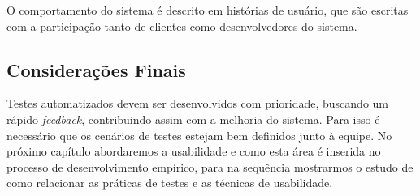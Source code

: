O comportamento do sistema é descrito em histórias de usuário, que são 
escritas com a participação tanto de clientes como desenvolvedores do sistema. 


\subsection{Considerações Finais}

Testes automatizados devem ser desenvolvidos com prioridade, buscando um rápido 
\textit{feedback}, contribuindo assim com a melhoria do sistema. Para isso é 
necessário que os cenários de testes estejam bem definidos junto à equipe.
%
No próximo capítulo abordaremos a usabilidade e como esta área é inserida no processo de desenvolvimento empírico, para na sequência mostrarmos o estudo de como relacionar as práticas de testes e as técnicas de usabilidade.

